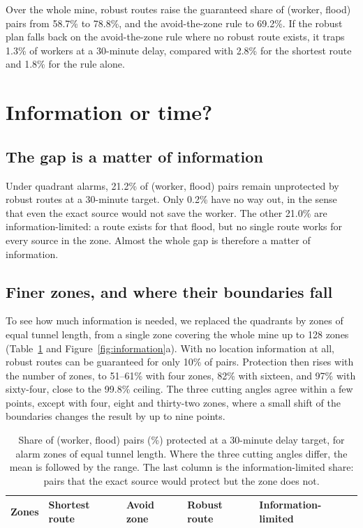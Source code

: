 \documentclass[11pt,a4paper]{article}
\begin{document}
Over the whole mine, robust routes raise the guaranteed share of (worker, flood) pairs from 58.7\% to 78.8\%, and the avoid-the-zone rule to 69.2\%. If the robust plan falls back on the avoid-the-zone rule where no robust route exists, it traps 1.3\% of workers at a 30-minute delay, compared with 2.8\% for the shortest route and 1.8\% for the rule alone.

\section{Information or time?}\label{sec:info}
\subsection{The gap is a matter of information}
Under quadrant alarms, 21.2\% of (worker, flood) pairs remain unprotected by robust routes at a 30-minute target. Only 0.2\% have no way out, in the sense that even the exact source would not save the worker. The other 21.0\% are information-limited: a route exists for that flood, but no single route works for every source in the zone. Almost the whole gap is therefore a matter of information.

\subsection{Finer zones, and where their boundaries fall}
To see how much information is needed, we replaced the quadrants by zones of equal tunnel length, from a single zone covering the whole mine up to 128 zones (Table~\ref{tab:resolution} and Figure~\ref{fig:information}a). With no location information at all, robust routes can be guaranteed for only 10\% of pairs. Protection then rises with the number of zones, to 51--61\% with four zones, 82\% with sixteen, and 97\% with sixty-four, close to the 99.8\% ceiling. The three cutting angles agree within a few points, except with four, eight and thirty-two zones, where a small shift of the boundaries changes the result by up to nine points.

\begin{table}[htbp]
\centering\small
\caption{Share of (worker, flood) pairs (\%) protected at a 30-minute delay target, for alarm zones of equal tunnel length. Where the three cutting angles differ, the mean is followed by the range. The last column is the information-limited share: pairs that the exact source would protect but the zone does not.}\label{tab:resolution}
\begin{tabular}{@{}lllll@{}}\toprule
Zones & Shortest route & Avoid zone & Robust route & Information-limited\\\midrule

\end{tabular}
\end{table}
\end{document}
